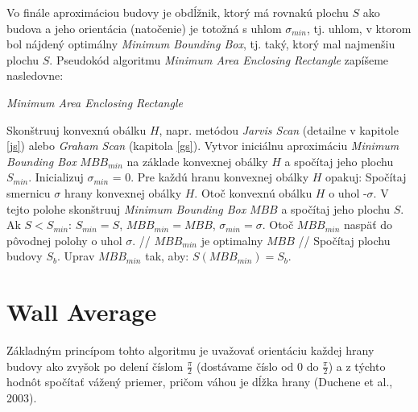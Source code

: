 \documentclass[11pt]{article}
\begin{document}
Vo finále aproximáciou budovy je obdĺžnik, ktorý má rovnakú plochu $S$ ako budova a jeho orientácia (natočenie) je totožná s uhlom $\sigma_{min}$, tj. uhlom, v ktorom bol nájdený optimálny \textit{Minimum Bounding Box}, tj. taký, ktorý mal najmenšiu plochu $S$.     
\newpage
\noindent Pseudokód algoritmu \textit{Minimum Area Enclosing Rectangle} zapíšeme nasledovne:
\begin{algorithm}
    \caption {\textit{Minimum Area Enclosing Rectangle}}
    \begin{algorithmic}[1]
        \State Skonštruuj konvexnú obálku $H$, napr. metódou \textit{Jarvis Scan} (detailne v kapitole \ref{js}) alebo \textit{Graham Scan} (kapitola \ref{gs}).
        \State Vytvor iniciálnu aproximáciu \textit{Minimum Bounding Box} $MBB_{min}$ na základe konvexnej obálky $H$ a spočítaj jeho plochu $S_{min}$.
        \State Inicializuj $\sigma_{min}$ = 0.
        \State Pre každú hranu konvexnej obálky $H$ opakuj:
        \State \indent Spočítaj smernicu $\sigma$ hrany konvexnej obálky $H$.
        \State \indent Otoč konvexnú obálku $H$ o uhol -$\sigma$.
        \State \indent V tejto polohe skonštruuj \textit{Minimum Bounding Box} $MBB$ a spočítaj jeho plochu $S$.
        \State \indent Ak $S < S_{min}$:
        \State \indent \indent $S_{min} = S$, $MBB_{min} = MBB$, $\sigma_{min} = \sigma$.
        \State Otoč $MBB_{min}$ naspäť do pôvodnej polohy o uhol $\sigma$. \quad // $MBB_{min}$ je optimalny $MBB$ //
        \State Spočítaj plochu budovy $S_b$.
        \State Uprav $MBB_{min}$ tak, aby: $S(MBB_{min}) = S_b$.
    \end{algorithmic}
\end{algorithm}

\newpage
\section{Wall Average}\label{wa}
Základným princípom tohto algoritmu je uvažovať orientáciu každej hrany budovy ako zvyšok po delení číslom $\frac{\pi}{2}$ (dostávame číslo od 0 do $\frac{\pi}{2}$) a z týchto hodnôt spočítať vážený priemer, pričom váhou je dĺžka hrany (Duchene et al., 2003).
\end{document}
